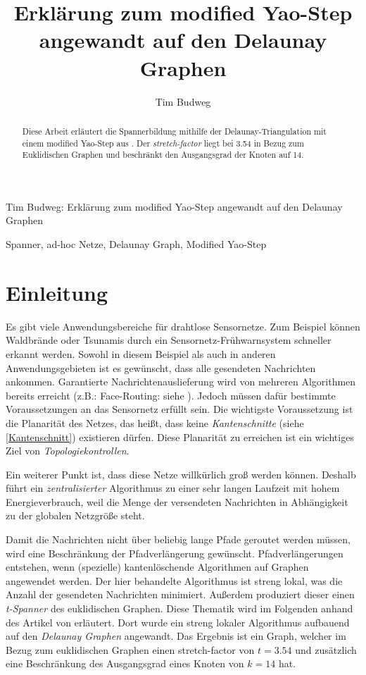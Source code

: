 \documentclass[a4paper,twoside]{IEEEtran}
\newcommand{\seminarteilnehmer}{Tim Budweg}
\newcommand{\seminartitel}{Erklärung zum modified Yao-Step angewandt auf den Delaunay Graphen}
\begin{document}
\title{\seminartitel}
\author{\seminarteilnehmer}

%
{\seminarteilnehmer: \seminartitel}


\maketitle

\begin{abstract}
Diese Arbeit erläutert die Spannerbildung mithilfe der Delaunay-Triangulation mit einem modified Yao-Step aus \cite{kanj}. Der \emph{stretch-factor} liegt bei 3.54 in Bezug zum Euklidischen Graphen und beschränkt den Ausgangsgrad der Knoten auf 14.
\end{abstract}

\begin{IEEEkeywords}
Spanner, ad-hoc Netze, Delaunay Graph, Modified Yao-Step
\end{IEEEkeywords}


\section{Einleitung}
Es gibt viele Anwendungsbereiche für drahtlose Sensornetze. 
Zum Beispiel können Waldbrände oder Tsunamis durch ein Sensornetz-Frühwarnsystem schneller erkannt werden. 
Sowohl in diesem Beispiel als auch in anderen Anwendungsgebieten ist es gewünscht, dass alle gesendeten Nachrichten ankommen.
Garantierte Nachrichtenauslieferung wird von mehreren Algorithmen bereits erreicht (z.B.: Face-Routing: siehe \cite{FaceRouting}).
Jedoch müssen dafür bestimmte Voraussetzungen an das Sensornetz erfüllt sein. 
Die wichtigste Voraussetzung ist die Planarität des Netzes, das heißt, dass keine \emph{Kantenschnitte} (siehe \ref{Kantenschnitt}) existieren dürfen. 
Diese Planarität zu erreichen ist ein wichtiges Ziel von \emph{Topologiekontrollen}.

Ein weiterer Punkt ist, dass diese Netze willkürlich groß werden können.
Deshalb führt ein \emph{zentralisierter} Algorithmus zu einer sehr langen Laufzeit mit hohem Energieverbrauch, weil die Menge der versendeten Nachrichten in Abhängigkeit zu der globalen Netzgröße steht.

Damit die Nachrichten nicht über beliebig lange Pfade geroutet werden müssen, wird eine Beschränkung der Pfadverlängerung gewünscht. 
Pfadverlängerungen entstehen, wenn (spezielle) kantenlöschende Algorithmen auf Graphen angewendet werden.
Der hier behandelte Algorithmus ist streng lokal, was die Anzahl der gesendeten Nachrichten minimiert.
Außerdem produziert dieser einen \emph{t-Spanner} des euklidischen Graphen.
Diese Thematik wird im Folgenden anhand des Artikel von \cite{kanj} erläutert.
Dort wurde ein streng lokaler Algorithmus aufbauend auf den \emph{Delaunay Graphen} angewandt.
Das Ergebnis ist ein Graph, welcher im Bezug zum euklidischen Graphen einen stretch-factor von $t=3.54 $ und zusätzlich eine Beschränkung des Ausgangsgrad eines Knoten von $k=14 $ hat.
\end{document}
